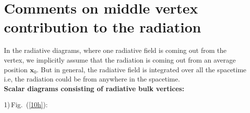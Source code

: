 \section{Comments on middle vertex contribution to the radiation}\label{ch1:app:D}
In the radiative diagrams, where one radiative field is coming out from the vertex, we implicitly assume that the radiation is coming out from an average position $\boldsymbol{x}_0$. But in general, the radiative field is integrated over all the spacetime i.e, the radiation could be from anywhere in the spacetime. \\

\textbf{Scalar diagrams consisting of radiative bulk vertices:}

1)\,Fig.~(\ref{10h}):

